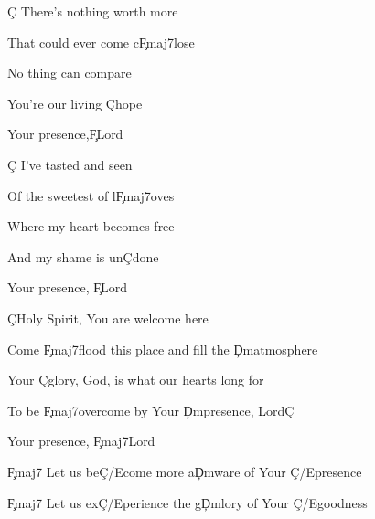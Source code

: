 \documentclass[9pt]{extarticle}
\begin{document}
\bsong

\bv
\c{C} There's nothing worth more

That could ever come c\c{Fmaj7}lose

No thing can compare

You're our living \c{C}hope

Your presence,\c{F}Lord
\ev

\bv
\c{C} I've tasted and seen

Of the sweetest of l\c{Fmaj7}oves

Where my heart becomes free

And my shame is un\c{C}done

Your presence, \c{F}Lord
\ev

\bc
\c{C}Holy Spirit, You are welcome here

Come \c{Fmaj7}flood this place and fill the \c{Dm}atmosphere

Your \c{C}glory, God, is what our hearts long for

To be \c{Fmaj7}overcome by Your \c{Dm}presence, Lord\c{C}

Your presence, \c{Fmaj7}Lord
\ec




\bb[4]
\c{Fmaj7} Let us be\c{C/E}come more a\c{Dm}ware of Your \c{C/E}presence

\c{Fmaj7} Let us ex\c{C/E}perience the g\c{Dm}lory of Your \c{C/E}goodness
\eb


\esong
\end{document}
